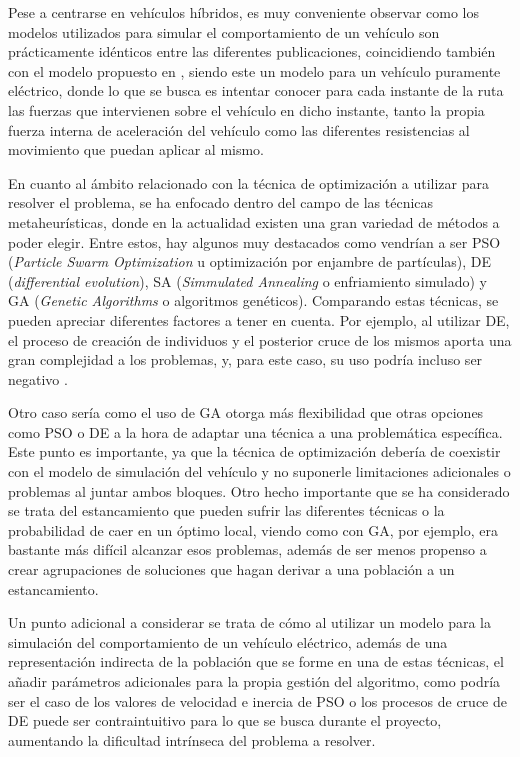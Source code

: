 \documentclass[11pt,spanish,listoffigures,listoftables]{tfgetsinf}
\begin{document}
Pese a centrarse en vehículos híbridos, es muy conveniente observar como los modelos utilizados para simular el comportamiento de un vehículo son prácticamente idénticos entre las diferentes publicaciones, coincidiendo también con el modelo propuesto en \cite{FIORI2016257}, siendo este un modelo para un vehículo puramente eléctrico, donde lo que se busca es intentar conocer para cada instante de la ruta las fuerzas que intervienen sobre el vehículo en dicho instante, tanto la propia fuerza interna de aceleración del vehículo como las diferentes resistencias al movimiento que puedan aplicar al mismo.

En cuanto al ámbito relacionado con la técnica de optimización a utilizar para resolver el problema, se ha enfocado dentro del campo de las técnicas metaheurísticas, donde en la actualidad existen una gran variedad de métodos a poder elegir. Entre estos, hay algunos muy destacados como vendrían a ser PSO (\textit{Particle Swarm Optimization} u optimización por enjambre de partículas), DE (\textit{differential evolution}), SA (\textit{Simmulated Annealing} o enfriamiento simulado) y GA (\textit{Genetic Algorithms} o algoritmos genéticos). Comparando estas técnicas, se pueden apreciar diferentes factores a tener en cuenta. Por ejemplo, al utilizar DE, el proceso de creación de individuos y el posterior cruce de los mismos aporta una gran complejidad a los problemas, y, para este caso, su uso podría incluso ser negativo \cite{KACHI2012}.

Otro caso sería como el uso de GA otorga más flexibilidad que otras opciones como PSO o DE a la hora de adaptar una técnica a una problemática específica. Este punto es importante, ya que la técnica de optimización debería de coexistir con el modelo de simulación del vehículo y no suponerle limitaciones adicionales o problemas al juntar ambos bloques. Otro hecho importante que se ha considerado se trata del estancamiento que pueden sufrir las diferentes técnicas o la probabilidad de caer en un óptimo local, viendo como con GA, por ejemplo, era bastante más difícil alcanzar esos problemas, además de ser menos propenso a crear agrupaciones de soluciones que hagan derivar a una población a un estancamiento.

Un punto adicional a considerar se trata de cómo al utilizar un modelo para la simulación del comportamiento de un vehículo eléctrico, además de una representación indirecta de la población que se forme en una de estas técnicas, el añadir parámetros adicionales para la propia gestión del algoritmo, como podría ser el caso de los valores de velocidad e inercia de PSO o los procesos de cruce de DE puede ser contraintuitivo para lo que se busca durante el proyecto, aumentando la dificultad intrínseca del problema a resolver.
\end{document}
